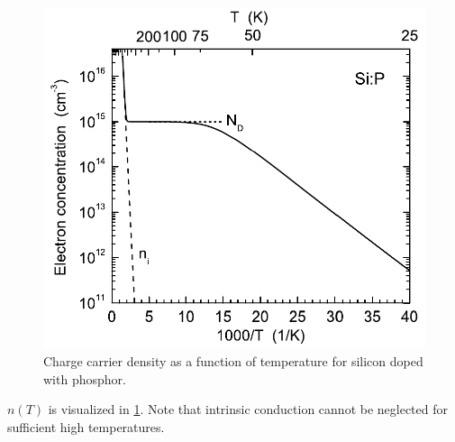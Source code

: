 \begin{figure}
	\centering
	\includegraphics[width=0.75\linewidth]{../assets/charge_carrier_density_temperature.png}
	\caption{Charge carrier density as a function of temperature for 
	silicon doped with phosphor. }
	\label{fig:carrier_temperature}
\end{figure}
$n(T)$ is visualized in \cref{fig:carrier_temperature}.
Note that intrinsic conduction cannot be neglected for sufficient high
temperatures.